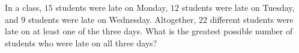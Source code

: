 In a class, $15$ students were late on Monday, $12$ students were late on Tuesday, and $9$ students were late on Wednesday. Altogether, $22$ different students were late on at least one of the three days. What is the greatest possible number of students who were late on all three days?
